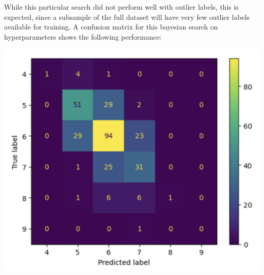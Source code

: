 \documentclass[titlepage]{article}
\begin{document}
\vspace{.2cm}\newline
While this particular search did not perform well with outlier labels, this is expected, since a subsample of the full dataset will have very few outlier labels available for training.  A confusion matrix for this bayesian search on hyperparameters shows the following performance:  
\begin{center}
	\includegraphics[width=.44\textwidth]{img/bayessearchperf.png}
\end{center}
\end{document}
